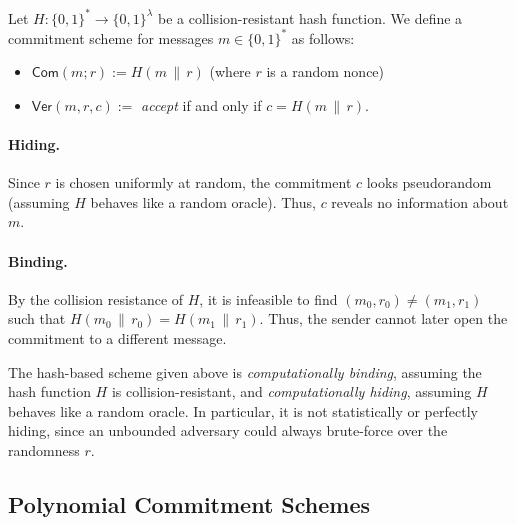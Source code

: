 \begin{example}
Let $H : \{0,1\}^* \to \{0,1\}^\lambda$ be a collision-resistant hash function.  
We define a commitment scheme for messages $m \in \{0,1\}^*$ as follows:
\begin{itemize}
    \item $\mathsf{Com}(m; r) := H(m \,\|\, r)$ (where $r$ is a random nonce)
    \item $\mathsf{Ver}(m, r, c) := $ \emph{accept} if and only if $c = H(m \,\|\, r)$.
\end{itemize}

\paragraph{Hiding.}  
Since $r$ is chosen uniformly at random, the commitment $c$ looks pseudorandom (assuming $H$ behaves like a random oracle). Thus, $c$ reveals no information about $m$.  

\paragraph{Binding.}  
By the collision resistance of $H$, it is infeasible to find $(m_0, r_0) \neq (m_1, r_1)$ such that
$
H(m_0 \,\|\, r_0) = H(m_1 \,\|\, r_1).
$
Thus, the sender cannot later open the commitment to a different message. 
\end{example}

\begin{remark}
The hash-based scheme given above is \emph{computationally binding}, assuming the hash function $H$ is collision-resistant, 
and \emph{computationally hiding}, assuming $H$ behaves like a random oracle.  
In particular, it is not statistically or perfectly hiding, since an unbounded adversary could always brute-force over the randomness $r$.
\end{remark}



\subsection{Polynomial Commitment Schemes}


